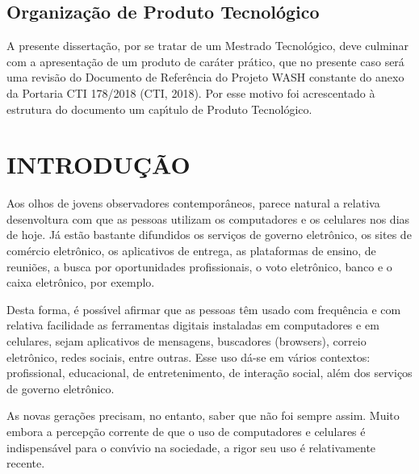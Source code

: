 \documentclass[
12pt,		%
openright,	%
twoside,  %
a4paper,			%
chapter=TITLE,		%
english,			%
french,				%
spanish,			%
brazil				%
]{USPSC-classe/USPSC_RedarTex}
\begin{document}
\section[Organiza\c{c}\~ao de Produto Tecnol\'ogico]{Organiza\c{c}\~ao de Produto Tecnol\'ogico}\label{Organiza\c{c}\~ao de Produto Tecnol\'ogico}
A presente disserta\c{c}\~ao, por se tratar de um Mestrado Tecnol\'ogico, deve culminar com a apresenta\c{c}\~ao de um \textquotedbl produto de car\'ater pr\'atico\textquotedbl , que no presente caso ser\'a uma revis\~ao do Documento de Refer\^encia do Projeto WASH  constante do anexo da  Portaria CTI 178/2018 (CTI, 2018). Por esse motivo foi acrescentado \`a estrutura do documento um cap\'{\i}tulo de \textquotedbl Produto Tecnol\'ogico\textquotedbl .










\chapter[INTRODU\c{C}\~AO]{INTRODU\c{C}\~AO}\label{INTRODU\c{C}\~AO}
Aos olhos de jovens observadores contempor\^aneos, parece natural a relativa desenvoltura com que as pessoas utilizam os computadores e os celulares nos dias de hoje. J\'a est\~ao bastante difundidos os servi\c{c}os de governo eletr\^onico, os sites de com\'ercio eletr\^onico, os  aplicativos de entrega, as plataformas de ensino, de reuni\~oes, a busca por oportunidades profissionais, o voto eletr\^onico, banco e o caixa eletr\^onico, por exemplo.










Desta forma, \'e poss\'{\i}vel afirmar que as pessoas t\^em usado com frequ\^encia e com relativa facilidade as ferramentas digitais instaladas em computadores e em celulares, sejam aplicativos de mensagens, buscadores (browsers), correio eletr\^onico, redes sociais, entre outras. Esse uso d\'a-se em v\'arios contextos: profissional, educacional, de entretenimento, de intera\c{c}\~ao social, al\'em dos servi\c{c}os de governo eletr\^onico.










As novas gera\c{c}\~oes precisam, no entanto, saber que n\~ao foi sempre assim. Muito embora a percep\c{c}\~ao corrente de que o uso de computadores e celulares \'e indispens\'avel para o conv\'{\i}vio na sociedade, a rigor seu uso \'e relativamente recente.
\end{document}
